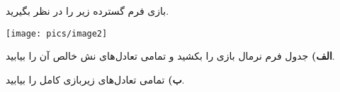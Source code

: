 بازی فرم گسترده زیر را در نظر بگیرید.
\begin{center}
    \texttt{[image: pics/image2]}
\end{center}

\textbf{الف)}
جدول فرم نرمال بازی را بکشید و تمامی تعادل‌های نش خالص آن را بیابید.
\vspace{5pt}

\textbf{ب)}
تمامی تعادل‌های زیربازی کامل را بیابید.
